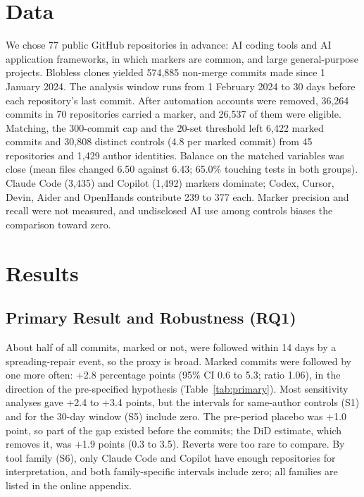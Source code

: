 \documentclass[runningheads]{llncs}
\begin{document}
\section{Data}
We chose 77 public GitHub repositories in advance: AI coding tools and AI application frameworks, in which markers are common, and large general-purpose projects. Blobless clones yielded 574,885 non-merge commits made since 1 January 2024. The analysis window runs from 1 February 2024 to 30 days before each repository's last commit. After automation accounts were removed, 36,264 commits in 70 repositories carried a marker, and 26,537 of them were eligible. Matching, the 300-commit cap and the 20-set threshold left 6,422 marked commits and 30,808 distinct controls (4.8 per marked commit) from 45 repositories and 1,429 author identities. Balance on the matched variables was close (mean files changed 6.50 against 6.43; 65.0\% touching tests in both groups). Claude Code (3,435) and Copilot (1,492) markers dominate; Codex, Cursor, Devin, Aider and OpenHands contribute 239 to 377 each. Marker precision and recall were not measured, and undisclosed AI use among controls biases the comparison toward zero.

\section{Results}
\subsection{Primary Result and Robustness (RQ1)}
About half of all commits, marked or not, were followed within 14 days by a spreading-repair event, so the proxy is broad. Marked commits were followed by one more often: +2.8 percentage points (95\% CI 0.6 to 5.3; ratio 1.06), in the direction of the pre-specified hypothesis (Table~\ref{tab:primary}). Most sensitivity analyses gave +2.4 to +3.4 points, but the intervals for same-author controls (S1) and for the 30-day window (S5) include zero. The pre-period placebo was +1.0 point, so part of the gap existed before the commits; the DiD estimate, which removes it, was +1.9 points (0.3 to 3.5). Reverts were too rare to compare. By tool family (S6), only Claude Code and Copilot have enough repositories for interpretation, and both family-specific intervals include zero; all families are listed in the online appendix.
\end{document}
